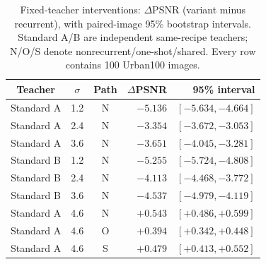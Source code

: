 \begin{table}[t]
\caption{Fixed-teacher interventions: $\Delta$PSNR (variant minus recurrent), with paired-image 95\% bootstrap intervals. Standard A/B are independent same-recipe teachers; N/O/S denote nonrecurrent/one-shot/shared. Every row contains 100 Urban100 images.}
\label{tab:supp_condition_ci}
\centering\footnotesize
\setlength{\tabcolsep}{3.0pt}
\begin{tabular}{cccrr}
\toprule
Teacher & $\sigma$ & Path & $\Delta$PSNR & 95\% interval\\
\midrule
Standard A & 1.2 & N & $-5.136$ & $[-5.634,-4.664]$\\
Standard A & 2.4 & N & $-3.354$ & $[-3.672,-3.053]$\\
Standard A & 3.6 & N & $-3.651$ & $[-4.045,-3.281]$\\
Standard B & 1.2 & N & $-5.255$ & $[-5.724,-4.808]$\\
Standard B & 2.4 & N & $-4.113$ & $[-4.468,-3.772]$\\
Standard B & 3.6 & N & $-4.537$ & $[-4.979,-4.119]$\\
\midrule
Standard A & 4.6 & N & $+0.543$ & $[+0.486,+0.599]$\\
Standard A & 4.6 & O & $+0.394$ & $[+0.342,+0.448]$\\
Standard A & 4.6 & S & $+0.479$ & $[+0.413,+0.552]$\\
\bottomrule
\end{tabular}
\end{table}

